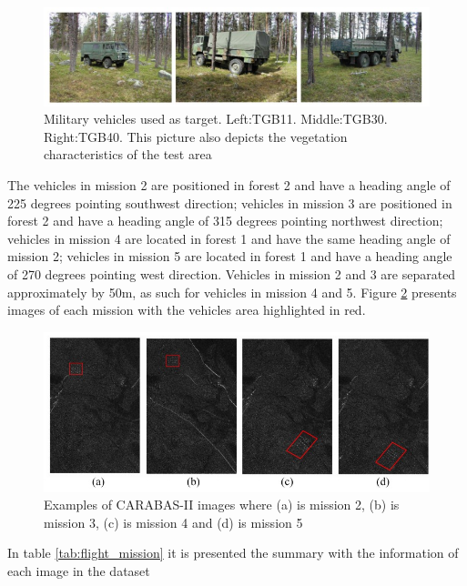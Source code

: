\begin{figure}[h]
    \centering
    \includegraphics{chapter6/carabas_vehicles_fisico.jpg}
    \caption{Military vehicles used as target. Left:TGB11. Middle:TGB30. Right:TGB40. 
    This picture also depicts the vegetation characteristics of the test area}
    \label{fig:veiculos}
\end{figure}

The vehicles in mission 2 are positioned in forest 2 and have a heading angle of 225 degrees pointing southwest direction;
vehicles in mission 3 are positioned in forest 2 and have a heading angle of 315 degrees pointing northwest direction;
vehicles in mission 4 are located in forest 1 and have the same heading angle of mission 2;
vehicles in mission 5 are located in forest 1 and have a heading angle of 270 degrees pointing west direction.
Vehicles in mission 2 and 3 are separated approximately by 50m, as such for vehicles in mission 4 and 5.
Figure \ref{fig:carabas_vehicles} presents images of each mission with the vehicles area highlighted in red.

\begin{figure}[h]
    \centering
    \includegraphics{chapter6/carabas_vehicles.jpg}
    \caption{Examples of CARABAS-II images where (a) is mission 2, (b) is mission 3, (c) is mission 4 and (d)
    is mission 5}
    \label{fig:carabas_vehicles}
\end{figure}

In table \ref{tab:flight_mission} it is presented the summary with the information of each image in the dataset

